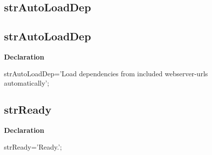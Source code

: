 \documentclass{report}
\newif\ifpdf
\begin{document}
\subsection*{\large{\textbf{strAutoLoadDep}}\normalsize\hspace{1ex}\hrulefill}
\else
\subsection*{strAutoLoadDep}
\fi
\label{trstrings-strAutoLoadDep}
\begin{list}{}{
\setlength{\itemindent}{0cm}
\setlength{\listparindent}{0cm}
\setlength{\leftmargin}{\evensidemargin}
\addtolength{\leftmargin}{\tmplength}
\settowidth{\labelsep}{X}
\addtolength{\leftmargin}{\labelsep}
\setlength{\labelwidth}{\tmplength}
}
\item[\textbf{Declaration}\hfill]
\ifpdf
\begin{flushleft}
\fi
\begin{ttfamily}
strAutoLoadDep='Load dependencies from included webserver-urls automatically';\end{ttfamily}

\ifpdf
\end{flushleft}
\fi

\end{list}
\ifpdf
\subsection*{\large{\textbf{strReady}}\normalsize\hspace{1ex}\hrulefill}
\else
\subsection*{strReady}
\fi
\label{trstrings-strReady}
\begin{list}{}{
\setlength{\itemindent}{0cm}
\setlength{\listparindent}{0cm}
\setlength{\leftmargin}{\evensidemargin}
\addtolength{\leftmargin}{\tmplength}
\settowidth{\labelsep}{X}
\addtolength{\leftmargin}{\labelsep}
\setlength{\labelwidth}{\tmplength}
}
\item[\textbf{Declaration}\hfill]
\ifpdf
\begin{flushleft}
\fi
\begin{ttfamily}
strReady='Ready.';\end{ttfamily}

\ifpdf
\end{flushleft}
\fi

\end{list}
\ifpdf
\end{document}
